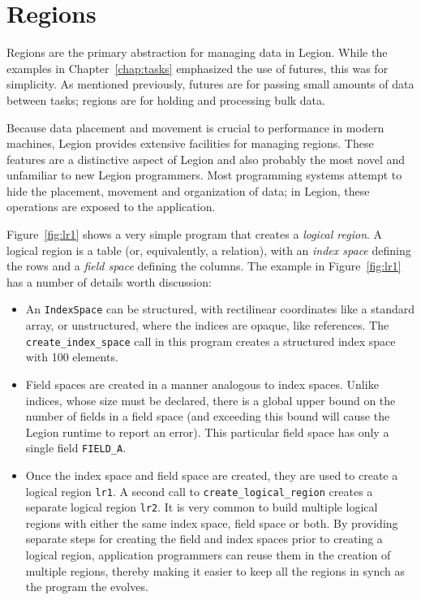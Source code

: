 \chapter{Regions}
\label{chap:regions}

Regions are the primary abstraction for managing data in Legion.  While the
examples in Chapter~\ref{chap:tasks} emphasized the use of futures, this was for
simplicity.  As mentioned previously, futures are for passing small amounts of data
between tasks; regions are for holding and processing bulk data.

Because data placement and movement is crucial to performance in modern machines,
Legion provides extensive facilities for managing regions.  These features are a
distinctive aspect of Legion and also probably the most novel and unfamiliar 
to new Legion programmers.  Most programming systems attempt to hide the placement,
movement and organization of data; in Legion, these operations are exposed to
the application.

Figure~\ref{fig:lr1} shows a very simple program that
creates a {\em logical region}.  A logical region is a table (or,
equivalently, a relation), with an {\em index space} defining the rows
and a {\em field space} defining the columns. The example
in Figure~\ref{fig:lr1} has a number of details worth discussion:

\begin{itemize}

\item An {\tt IndexSpace} can be structured, with rectilinear coordinates like a standard
array, or unstructured, where the indices are opaque, like references.  The {\tt create\_index\_space}
call in this program creates a structured index space with 100 elements.

\item Field spaces are created in a manner analogous to index spaces.
  Unlike indices, whose size must be declared, there is a global upper
  bound on the number of fields in a field space (and exceeding this bound will cause
  the Legion runtime to report an error).  This particular
  field space has only a single field {\tt FIELD\_A}.

\item Once the index space and field space are created, they are used to create
a logical region {\tt lr1}.  A second call to {\tt create\_logical\_region}
creates a separate logical region {\tt lr2}.  It is very common to build
multiple logical regions with either the same index space, field space or both.
By providing separate steps for creating the field and index spaces prior to creating
a logical region, application programmers can reuse them in the creation of multiple
regions, thereby making it easier to keep all the regions in synch as the program the
evolves.
\end{itemize}

